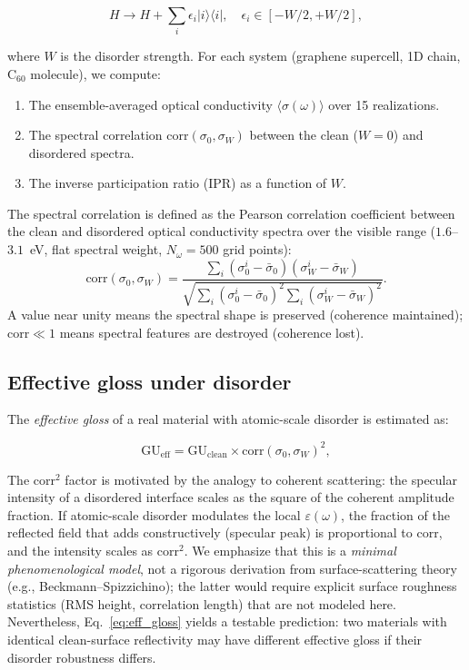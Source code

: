 \documentclass[twocolumn,showpacs,preprintnumbers,amsmath,amssymb,prb]{revtex4-2}
\begin{document}
\begin{equation}
  H \to H + \sum_i \epsilon_i |i\rangle\langle i|,
  \quad \epsilon_i \in [-W/2, +W/2],
  \label{eq:anderson}
\end{equation}

\noindent where $W$ is the disorder strength. For each system (graphene
supercell, 1D chain, C$_{60}$ molecule), we compute:

\begin{enumerate}
  \item The ensemble-averaged optical conductivity $\langle\sigma(\omega)\rangle$
    over 15 realizations.
  \item The spectral correlation $\mathrm{corr}(\sigma_0, \sigma_W)$
    between the clean ($W=0$) and disordered spectra.
  \item The inverse participation ratio (IPR) as a function of $W$.
\end{enumerate}

The spectral correlation is defined as the Pearson correlation
coefficient between the clean and disordered optical conductivity
spectra over the visible range ($1.6$--$3.1$~eV, flat spectral
weight, $N_\omega = 500$ grid points):
\begin{equation}
  \mathrm{corr}(\sigma_0, \sigma_W) =
  \frac{\sum_i (\sigma_0^i - \bar{\sigma}_0)
        (\sigma_W^i - \bar{\sigma}_W)}
  {\sqrt{\sum_i (\sigma_0^i - \bar{\sigma}_0)^2
         \sum_i (\sigma_W^i - \bar{\sigma}_W)^2}}.
  \label{eq:corr}
\end{equation}
A value near unity means the spectral shape is preserved
(coherence maintained); $\mathrm{corr} \ll 1$ means spectral
features are destroyed (coherence lost).

\subsection{Effective gloss under disorder}

The \emph{effective gloss} of a real material with atomic-scale disorder
is estimated as:

\begin{equation}
  \mathrm{GU}_\mathrm{eff} = \mathrm{GU}_\mathrm{clean} \times
    \mathrm{corr}(\sigma_0, \sigma_W)^2,
  \label{eq:eff_gloss}
\end{equation}

\noindent The $\mathrm{corr}^2$ factor is motivated by the
analogy to coherent scattering: the specular intensity of a
disordered interface scales as the square of the coherent
amplitude fraction. If atomic-scale disorder modulates the local
$\varepsilon(\omega)$, the fraction of the reflected field that
adds constructively (specular peak) is proportional to $\mathrm{corr}$,
and the intensity scales as $\mathrm{corr}^2$. We emphasize that
this is a \emph{minimal phenomenological model}, not a rigorous
derivation from surface-scattering theory (e.g.,
Beckmann--Spizzichino); the latter would require explicit surface
roughness statistics (RMS height, correlation length) that are not
modeled here. Nevertheless, Eq.~\ref{eq:eff_gloss} yields a testable
prediction: two materials with identical clean-surface reflectivity
may have different effective gloss if their disorder robustness differs.
\end{document}
